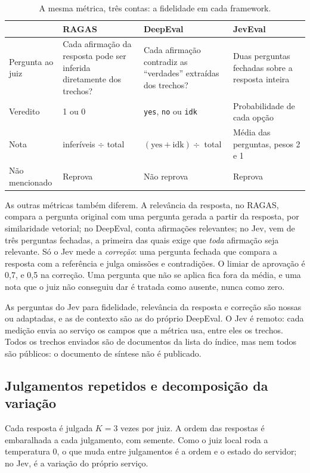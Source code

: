 \documentclass[12pt]{article}
\newcommand{\code}[1]{\texttt{\small #1}}
\begin{document}
\begin{table}[htb]
\centering
\small
\caption{A mesma métrica, três contas: a fidelidade em cada framework.}
\label{tab:juizes}
\begin{tabular}{@{}lL{3.7cm}L{3.4cm}L{3.5cm}@{}}
\toprule
 & RAGAS & DeepEval & JevEval \\
\midrule
Pergunta ao juiz & Cada afirmação da resposta pode ser inferida diretamente dos
trechos? & Cada afirmação contradiz as ``verdades'' extraídas dos trechos? & Duas
perguntas fechadas sobre a resposta inteira \\
Veredito & 1 ou 0 & \code{yes}, \code{no} ou \code{idk} & Probabilidade de cada
opção \\
Nota & inferíveis $\div$ total & $(\mathrm{yes}+\mathrm{idk}) \div$ total & Média das
perguntas, pesos 2 e 1 \\
Não mencionado & Reprova & Não reprova & Reprova \\
\bottomrule
\end{tabular}
\end{table}

As outras métricas também diferem. A relevância da resposta, no RAGAS, compara a
pergunta original com uma pergunta gerada a partir da resposta, por similaridade
vetorial; no DeepEval, conta afirmações relevantes; no Jev, vem de três perguntas
fechadas, a primeira das quais exige que \emph{toda} afirmação seja relevante. Só o
Jev mede a \emph{correção}: uma pergunta fechada que compara a resposta com a
referência e julga omissões e contradições. O limiar de aprovação é 0,7, e 0,5 na
correção. Uma pergunta que não se aplica fica fora da média, e uma nota que o juiz
não conseguiu dar é tratada como ausente, nunca como zero.

As perguntas do Jev para fidelidade, relevância da resposta e correção são nossas
ou adaptadas, e as de contexto são as do próprio DeepEval. O Jev é remoto: cada
medição envia ao serviço os campos que a métrica usa, entre eles os trechos. Todos os
trechos enviados são de documentos da lista do índice, mas nem todos são públicos: o
documento de síntese não é publicado.

\subsection{Julgamentos repetidos e decomposição da variação}
\label{sec:decomposicao}

Cada resposta é julgada $K = 3$ vezes por juiz. A ordem das respostas é
embaralhada a cada julgamento, com semente. Como o juiz local roda a temperatura
0, o que muda entre julgamentos é a ordem e o estado do servidor; no Jev, é a
variação do próprio serviço.
\end{document}

